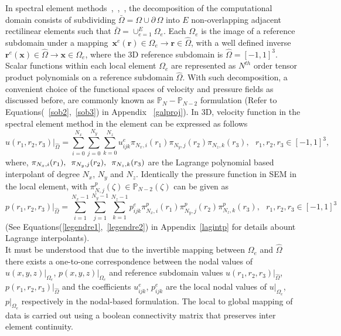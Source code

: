 In spectral element methods~\cite{patera3},~\cite{deville},~\cite{fischer_jcp}, the decomposition of the computational domain consists of  subdividing $\bar{\Omega} = \Omega\cup \partial\, \Omega$ into $E$ non-overlapping adjacent rectilinear elements such that $\bar{\Omega} = \cup_{e=1}^{E}\Omega_{e}$. Each ${\Omega_{e}}$ is the image of a reference subdomain under a mapping\ ${\pmb{x}}^{e}(\pmb{r}) \in {\Omega_{e}} \rightarrow \pmb{r}\in {\hat{\Omega}}$, with a well defined inverse  ${\pmb{r}}^{e}(\pmb{x}) \in \hat{{\Omega}} \rightarrow \pmb{x}\in {\Omega_{e}}$, where the 3D reference subdomain is ${\hat{\Omega}} = [-1,1]^{3}$. Scalar functions within each local element ${{\Omega}_{e}}$ are represented as $N^{th}$ order tensor product polynomials on a reference subdomain ${\hat{\Omega}}$. With such decomposition, a convenient choice of the functional spaces of velocity and pressure fields as discussed before, are commonly known as $\mathbb{P}_{N}-\mathbb{P}_{N-2}$ formulation (Refer to Equations(~\ref{sob2},~\ref{sob3}) in Appendix ~\ref{galproj}).
In 3D, velocity function in the spectral element method in the element can be expressed as follows
\begin{equation}
u(r_1,r_2,r_3)|_{\hat{\Omega}} = \displaystyle\sum_{i=0}^{N_x}\sum_{j=0}^{N_y}\sum_{k=0}^{N_z}u_{ijk}^{e}\pi_{N_x,i}({r_1})\pi_{N_y,j}({r_2})\pi_{N_z,k}({r_3}),  \ \ \ {r_1},{r_2},{r_3}\in [-1,1]^3,
\end{equation}
where, $\pi_{N_x,i}(r_1),\hspace{0.5em} \pi_{N_y,j}(r_2), \hspace{0.5em}\pi_{N_z,k}(r_3)$ are the Lagrange polynomial based interpolant of degree $N_x$, $N_y$ and $N_z$.
Identically the pressure function in SEM in the local element, with $\pi^{p}_{N,j}({\zeta}) \in \mathbb{P}_{N-2}(\zeta)$ can be given as 
\begin{equation}
p(r_1,r_2,r_3)|_{\hat{\Omega}} = \displaystyle\sum_{i=1}^{N_x-1}\sum_{j=1}^{N_y-1}\sum_{k=1}^{N_z-1}p_{ijk}^{e}\pi^{p}_{N_x,i}({r_1})\pi^{p}_{N_y,j}({r_2})\pi^{p}_{N_z,k}({r_3}),  \ \ \ {r_1},{r_2},{r_3}\in [-1,1]^3
\end{equation}
 (See Equations(\ref{legendre1},~\ref{legendre2}) in Appendix~\ref{lagintp} for details abount Lagrange interpolants).\\
It must be understood that due to the invertible mapping between $\Omega_{e}$ and $\hat{\Omega}$ there exists a one-to-one correspondence between the nodal values of $u(x,y,z)|_{\Omega_{e}}$, $p(x,y,z)|_{\Omega_{e}}$ and reference subdomain values $u(r_1,r_2,r_3)|_{\hat{\Omega}}$, $p(r_1,r_2,r_3)|_{\hat{\Omega}}$ and the coefficients $u_{ijk}^{e}$, $p_{ijk}^{e}$ are the local nodal values of $u|_{\Omega_{e}}$, $p|_{\Omega_{e}}$ respectively in the nodal-based formulation. The local to global mapping of data is carried out using a boolean connectivity matrix that preserves inter element continuity.\\
